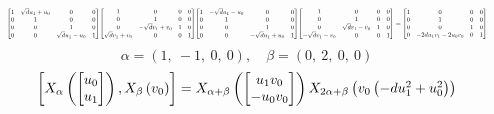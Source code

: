 \documentclass[11pt]{article}
\theoremstyle{definition}
\begin{document}
\[
\scaletoalign{\textwidth}{{\left[\begin{matrix}1 & \sqrt{d} u_{1} + u_{0} & 0 & 0\\0 & 1 & 0 & 0\\0 & 0 & 1 & 0\\0 & 0 & \sqrt{d} u_{1} - u_{0} & 1\end{matrix}\right]} {\left[\begin{matrix}1 & 0 & 0 & 0\\0 & 1 & 0 & 0\\0 & - \sqrt{d} v_{1} + v_{0} & 1 & 0\\\sqrt{d} v_{1} + v_{0} & 0 & 0 & 1\end{matrix}\right]} {\left[\begin{matrix}1 & - \sqrt{d} u_{1} - u_{0} & 0 & 0\\0 & 1 & 0 & 0\\0 & 0 & 1 & 0\\0 & 0 & - \sqrt{d} u_{1} + u_{0} & 1\end{matrix}\right]} {\left[\begin{matrix}1 & 0 & 0 & 0\\0 & 1 & 0 & 0\\0 & \sqrt{d} v_{1} - v_{0} & 1 & 0\\- \sqrt{d} v_{1} - v_{0} & 0 & 0 & 1\end{matrix}\right]} = {\left[\begin{matrix}1 & 0 & 0 & 0\\0 & 1 & 0 & 0\\0 & 0 & 1 & 0\\0 & - 2 d u_{1} v_{1} - 2 u_{0} v_{0} & 0 & 1\end{matrix}\right]}}
\]
\[
\alpha = \left( 1, \  -1, \  0, \  0\right), \quad \beta = \left( 0, \  2, \  0, \  0\right)
\]
\[
\scaletoalign{\textwidth}{\left[ X_{\alpha}\left(\left[\begin{matrix}u_{0}\\u_{1}\end{matrix}\right]\right), X_{\beta}\left(v_{0}\right) \right] = X_{\alpha + \beta}\left(\left[\begin{matrix}u_{1} v_{0}\\- u_{0} v_{0}\end{matrix}\right]\right) X_{2\alpha + \beta}\left(v_{0} \left(- d u_{1}^{2} + u_{0}^{2}\right)\right)}
\]
\end{document}
